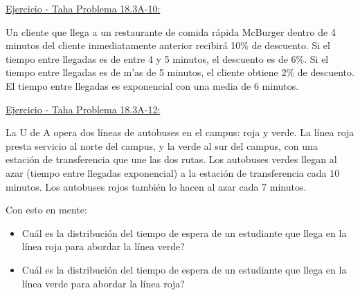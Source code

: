 \documentclass[ 10pt, xcolor = dvipsnames]{beamer}
\begin{document}
\begin{frame}[allowframebreaks]
\framebreak

\underline{Ejercicio - Taha Problema 18.3A-10:}

Un cliente que llega a un restaurante de comida r\'apida McBurger dentro de 4 minutos del cliente inmediatamente anterior recibir\'a 10\% de descuento. \linebreak Si el tiempo entre llegadas es de entre 4 y 5 minutos, el descuento es de 6\%. \linebreak Si el tiempo entre llegadas es de m'as de 5 minutos, el cliente obtiene 2\% de descuento. El tiempo entre llegadas es exponencial con una media de 6 minutos. 

\framebreak

\underline{Ejercicio - Taha Problema 18.3A-12:}

La U de A opera dos l\'ineas de autobuses en el campus: roja y verde. La l\'inea roja presta servicio al norte del campus, y la verde al sur del campus, con una estaci\'on de transferencia que une las dos rutas. Los autobuses verdes llegan al azar (tiempo entre llegadas exponencial) a la estaci\'on de transferencia cada 10 minutos. Los autobuses rojos tambi\'en lo hacen al azar cada 7 minutos. 

Con esto en mente: 
\begin{itemize}
\item Cu\'al es la distribuci\'on del tiempo de espera de un estudiante que llega en la l\'inea roja para abordar la l\'inea verde? 
\item Cu\'al es la distribuci\'on del tiempo de espera de un estudiante que llega en la l\'inea verde para abordar la l\'inea roja? 
\end{itemize}

\end{frame}
\end{document}
